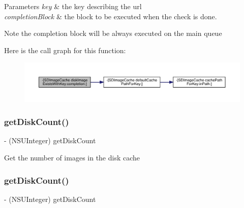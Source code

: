 \begin{DoxyParams}{Parameters}
{\em key} & the key describing the url \\
\hline
{\em completion\+Block} & the block to be executed when the check is done. \\
\hline
\end{DoxyParams}
\begin{DoxyNote}{Note}
the completion block will be always executed on the main queue 
\end{DoxyNote}
Here is the call graph for this function\+:\nopagebreak
\begin{figure}[H]
\begin{center}
\leavevmode
\includegraphics[width=350pt]{interface_s_d_image_cache_a2baefc1300fcd3c57a25b5326dda8834_cgraph}
\end{center}
\end{figure}
\mbox{\label{interface_s_d_image_cache_abc59ee03f3afc7d9fa202a0790f8b5c0}} 
\subsubsection{\texorpdfstring{get\+Disk\+Count()}{getDiskCount()}\hspace{0.1cm}{\footnotesize\ttfamily [1/3]}}
{\footnotesize\ttfamily -\/ (N\+S\+U\+Integer) get\+Disk\+Count \begin{DoxyParamCaption}{ }\end{DoxyParamCaption}}

Get the number of images in the disk cache \mbox{\label{interface_s_d_image_cache_abc59ee03f3afc7d9fa202a0790f8b5c0}} 
\subsubsection{\texorpdfstring{get\+Disk\+Count()}{getDiskCount()}\hspace{0.1cm}{\footnotesize\ttfamily [2/3]}}
{\footnotesize\ttfamily -\/ (N\+S\+U\+Integer) get\+Disk\+Count \begin{DoxyParamCaption}{ }\end{DoxyParamCaption}}

